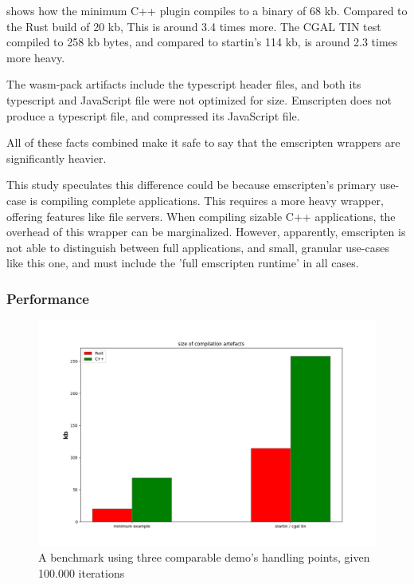  shows how the minimum C++ plugin compiles to a binary of 68 kb. 
Compared to the Rust build of 20 kb, This is around 3.4 times more. 
The CGAL TIN test compiled to 258 kb bytes, and compared to startin's 114 kb, is around 2.3 times more heavy.

The wasm-pack artifacts include the typescript header files, and both its typescript and JavaScript file were not optimized for size.
Emscripten does not produce a typescript file, and compressed its JavaScript file. 

All of these facts combined make it safe to say that the emscripten wrappers are significantly heavier.

This study speculates this difference could be because emscripten's primary use-case is compiling complete applications. 
This requires a more heavy wrapper, offering features like file servers. 
When compiling sizable C++ applications, the overhead of this wrapper can be marginalized.
However, apparently, emscripten is not able to distinguish between full applications, and small, granular use-cases like this one, and must include the 'full emscripten runtime' in all cases.

\subsubsection*{Performance}

\begin{figure}
  \graphicspath{{../../assets/plots/rust-cpp-compilation-size/}}
  \centering
  \includegraphics[width=\linewidth]{figure.png}
  \caption[]{A benchmark using three comparable demo's handling points, given 100.000 iterations}
  \label{fig:rust-cpp-performance}
\end{figure}

